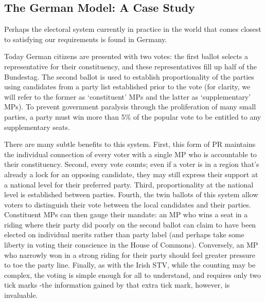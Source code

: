 \documentclass[DIV=calc, paper=a4, fontsize=11pt, twocolumn]{scrartcl}	 %
\begin{document}
\subsection{The German Model: A Case Study}
\label{sec:german_model}

Perhaps the electoral system currently in practice in the world that comes closest to satisfying our requirements is found in Germany.

Today German citizens are presented with two votes: the first ballot selects a representative for their constituency, and these representatives fill up half of the Bundestag. The second ballot is used to establish proportionality of the parties using candidates from a party list established prior to the vote
(for clarity, we will refer to the former as `constituent' MPs  and the latter as `supplementary' MPs).
To prevent government paralysis through the proliferation of many small parties, a party must win more than 5\% of the popular vote to be entitled to any supplementary seats.

There are many subtle benefits to this system. 
First, this form of PR maintains the individual connection of every voter with a single MP who is accountable to their constituency.
Second, every vote counts; even if a voter is in a region that's already a lock for an opposing candidate, they may still express their support at a national level for their preferred party.
Third, proportionality at the national level is established between parties.
Fourth, the twin ballots of this system allow voters to distinguish their vote between the local candidates and their parties.  Constituent MPs can then gauge their mandate: an MP who wins a seat in a riding where their party did poorly on the second ballot can claim to have been elected on individual merits rather than party label (and perhaps take some liberty in voting their conscience in the House of Commons). Conversely, an MP who narrowly won in a strong riding for their party should feel greater pressure to toe the party line.
Finally, as with the Irish STV, while the counting may be complex, the voting is simple enough for all to understand, and requires only two tick marks \--the information gained by that extra tick mark, however, is invaluable.
\end{document}
